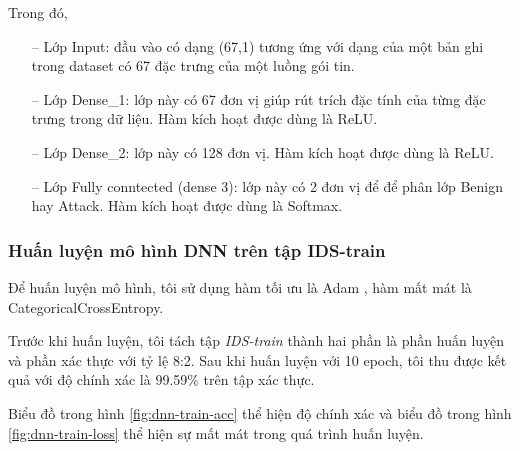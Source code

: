 Trong đó,

\begin{itemize}
	\item[--] Lớp Input: đầu vào có dạng (67,1) tương ứng với dạng của một bản ghi trong dataset có 67 đặc trưng của một luồng gói tin.
	\item[--] Lớp Dense\_1: lớp này có 67 đơn vị giúp rút trích đặc tính của từng đặc trưng trong dữ liệu. Hàm kích hoạt được dùng là ReLU.
	\item[--] Lớp Dense\_2: lớp này có 128 đơn vị. Hàm kích hoạt được dùng là ReLU.
	\item[--] Lớp Fully conntected (dense 3): lớp này có 2 đơn vị để để phân lớp Benign hay Attack. Hàm kích hoạt được dùng là Softmax.
\end{itemize}

\subsubsection{Huấn luyện mô hình DNN trên tập IDS-train}

Để huấn luyện mô hình, tôi sử dụng hàm tối ưu là Adam \cite{60-Kingma}, hàm mất mát là CategoricalCrossEntropy.

Trước khi huấn luyện, tôi tách tập \textit{IDS-train} thành hai phần là phần huấn luyện và phần xác thực với tỷ lệ 8:2. Sau khi huấn luyện với 10 epoch, tôi thu được kết quả với độ chính xác là 99.59\% trên tập xác thực.

Biểu đồ trong hình \ref{fig:dnn-train-acc} thể hiện độ chính xác và biểu đồ trong hình \ref{fig:dnn-train-loss} thể hiện sự mất mát trong quá trình huấn luyện.


